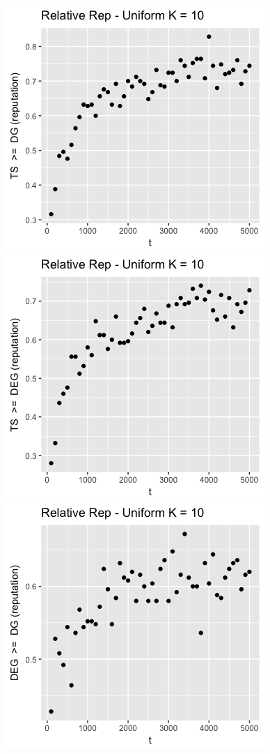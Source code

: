 \documentclass[11pt,letterpaper]{article}
\begin{document}
\includegraphics[scale=0.5]{ts_dg_uniform_10_prelim} \\
\includegraphics[scale=0.5]{ts_deg_unif_10_prelim} \\
\includegraphics[scale=0.4]{deg_dg_unif_10_prelim} \\
\end{document}
